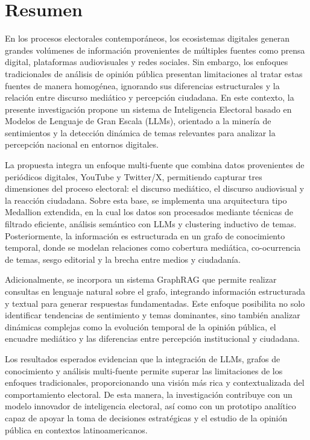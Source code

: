 \documentclass[listof=nochaptergap,12pt,times,authoryear]{report}
\begin{document}
\chapter*{Resumen}

En los procesos electorales contemporáneos, los ecosistemas digitales generan grandes volúmenes de información provenientes de múltiples fuentes como prensa digital, plataformas audiovisuales y redes sociales. Sin embargo, los enfoques tradicionales de análisis de opinión pública presentan limitaciones al tratar estas fuentes de manera homogénea, ignorando sus diferencias estructurales y la relación entre discurso mediático y percepción ciudadana. En este contexto, la presente investigación propone un sistema de Inteligencia Electoral basado en Modelos de Lenguaje de Gran Escala (LLMs), orientado a la minería de sentimientos y la detección dinámica de temas relevantes para analizar la percepción nacional en entornos digitales.

La propuesta integra un enfoque multi-fuente que combina datos provenientes de periódicos digitales, YouTube y Twitter/X, permitiendo capturar tres dimensiones del proceso electoral: el discurso mediático, el discurso audiovisual y la reacción ciudadana. Sobre esta base, se implementa una arquitectura tipo Medallion extendida, en la cual los datos son procesados mediante técnicas de filtrado eficiente, análisis semántico con LLMs y clustering inductivo de temas. Posteriormente, la información es estructurada en un grafo de conocimiento temporal, donde se modelan relaciones como cobertura mediática, co-ocurrencia de temas, sesgo editorial y la brecha entre medios y ciudadanía.

Adicionalmente, se incorpora un sistema GraphRAG que permite realizar consultas en lenguaje natural sobre el grafo, integrando información estructurada y textual para generar respuestas fundamentadas. Este enfoque posibilita no solo identificar tendencias de sentimiento y temas dominantes, sino también analizar dinámicas complejas como la evolución temporal de la opinión pública, el encuadre mediático y las diferencias entre percepción institucional y ciudadana.

Los resultados esperados evidencian que la integración de LLMs, grafos de conocimiento y análisis multi-fuente permite superar las limitaciones de los enfoques tradicionales, proporcionando una visión más rica y contextualizada del comportamiento electoral. De esta manera, la investigación contribuye con un modelo innovador de inteligencia electoral, así como con un prototipo analítico capaz de apoyar la toma de decisiones estratégicas y el estudio de la opinión pública en contextos latinoamericanos.
\end{document}
